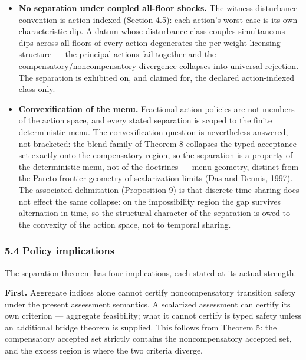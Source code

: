 \documentclass[11pt]{article}
\begin{document}
\begin{itemize}
  disturbance classes, common safe-set inclusion, common horizon, common
  tube semantics, and common terminal condition. It does not establish a
  universal ranking of endpoint, weak, and strong sustainability
  doctrines.
\item
  \textbf{No separation under coupled all-floor shocks.} The witness
  disturbance convention is action-indexed (Section 4.5): each action's
  worst case is its own characteristic dip. A datum whose disturbance
  class couples simultaneous dips across all floors of every action
  degenerates the per-weight licensing structure --- the principal
  actions fail together and the compensatory/noncompensatory divergence
  collapses into universal rejection. The separation is exhibited on,
  and claimed for, the declared action-indexed class only.
\item
  \textbf{Convexification of the menu.} Fractional action policies are
  not members of the action space, and every stated separation is scoped
  to the finite deterministic menu. The convexification question is
  nevertheless answered, not bracketed: the blend family of Theorem 8
  collapses the typed acceptance set exactly onto the compensatory
  region, so the separation is a property of the deterministic menu, not
  of the doctrines --- menu geometry, distinct from the Pareto-frontier
  geometry of scalarization limits (Das and Dennis, 1997). The
  associated delimitation (Proposition 9) is that discrete time-sharing
  does not effect the same collapse: on the impossibility region the gap
  survives alternation in time, so the structural character of the
  separation is owed to the convexity of the action space, not to
  temporal sharing.
\end{itemize}

\subsubsection{5.4 Policy implications}\label{policy-implications}

The separation theorem has four implications, each stated at its actual
strength.

\textbf{First.} Aggregate indices alone cannot certify noncompensatory
transition safety under the present assessment semantics. A scalarized
assessment can certify its own criterion --- aggregate feasibility; what
it cannot certify is typed safety unless an additional bridge theorem is
supplied. This follows from Theorem 5: the compensatory accepted set
strictly contains the noncompensatory accepted set, and the excess
region is where the two criteria diverge.
\end{document}
